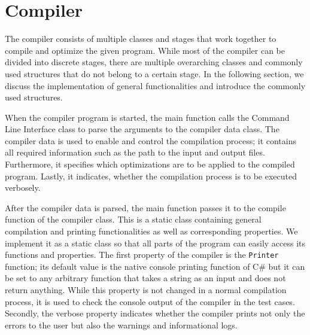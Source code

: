 \section{Compiler}
\label{sec:implementation_compiler}
The compiler consists of multiple classes and stages that work together to compile and optimize the given program. While most of the compiler can be divided into discrete stages, there are multiple overarching classes and commonly used structures that do not belong to a certain stage. In the following section, we discuss the implementation of general functionalities and introduce the commonly used structures.

When the compiler program is started, the main function calls the Command Line Interface class to parse the arguments to the compiler data class. The compiler data is used to enable and control the compilation process; it contains all required information such as the path to the input and output files. Furthermore, it specifies which optimizations are to be applied to the compiled program. Lastly, it indicates, whether the compilation process is to be executed verbosely. 

After the compiler data is parsed, the main function passes it to the compile function of the compiler class. This is a static class containing general compilation and printing functionalities as well as corresponding properties. We implement it as a static class so that all parts of the program can easily access its functions and properties. The first property of the compiler is the \texttt{Printer} function; its default value is the native console printing function of C\# but it can be set to any arbitrary function that takes a string as an input and does not return anything. While this property is not changed in a normal compilation process, it is used to check the console output of the compiler in the test cases. Secondly, the verbose property indicates whether the compiler prints not only the errors to the user but also the warnings and informational logs.

